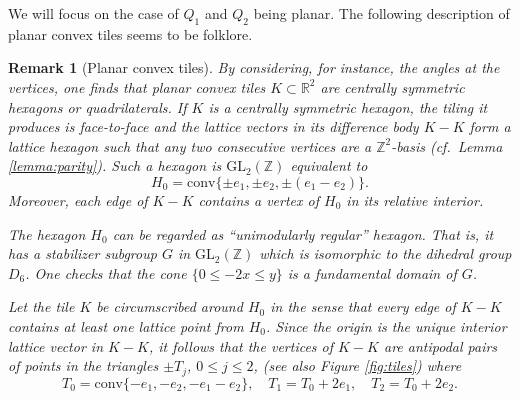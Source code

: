 \documentclass[11pt, a4paper]{amsart}
\newcommand{\RR}{\mathbb{R}}
\newcommand{\ZZ}{\mathbb{Z}}
\newcommand{\conv}{\mathrm{conv}}
\newcommand{\GL}{\mathrm{GL}}
\numberwithin{equation}{section}
\theoremstyle{plain}
\newtheorem{remark}[theorem]{Remark}
\begin{document}
We will focus on the case of $Q_1$ and $Q_2$ being planar. The following description of planar convex tiles seems to be folklore.

\begin{remark}[Planar convex tiles]
\label{rem:tiles}
By considering, for instance, the angles at the vertices, one finds that planar convex tiles $K\subset\RR^2$ are centrally symmetric hexagons or quadrilaterals. If $K$ is a centrally symmetric hexagon, the tiling it produces is face-to-face and the lattice vectors in its difference body $K-K$ form a lattice hexagon such that any two consecutive vertices are a $\ZZ^2$-basis (cf.\ Lemma \ref{lemma:parity}). Such a hexagon is $\GL_2(\ZZ)$ equivalent to
\[
H_0 = \conv \{ \pm e_1,\pm e_2, \pm(e_1-e_2)\}.
\]
Moreover, each edge of $K-K$ contains a vertex of $H_0$ in its relative interior.


The hexagon $H_0$ can be regarded as ``unimodularly regular'' hexagon. That is, it has a stabilizer subgroup $G$ in $\GL_2(\ZZ)$ which is isomorphic to the dihedral group $D_6$. One checks that the cone $\{0\leq -2x\leq y\}$ is a fundamental domain of $G$.


Let the tile $K$ be circumscribed around $H_0$ in the sense that every edge of $K - K$ contains at least one lattice point from $H_0$. Since the origin is the unique interior lattice vector in $K - K$, it follows that the vertices of $K - K$ are antipodal pairs of points in the triangles $\pm T_j$, $0\leq j \leq 2$, (see also Figure \ref{fig:tiles}) where
\[
T_0 = \conv\{-e_1,-e_2, -e_1-e_2\},\quad T_1 = T_0 +2e_1, \quad T_2 = T_0+2e_2.
\]

\begin{figure}[!h]
	\centering
	\begin{minipage}{0.3\textwidth}
	\centering
	\end{minipage}
	\hspace{0.05\textwidth}
	\begin{minipage}{0.25\textwidth}
	\centering
		

\end{minipage}
\end{figure}
\end{remark}
\end{document}
